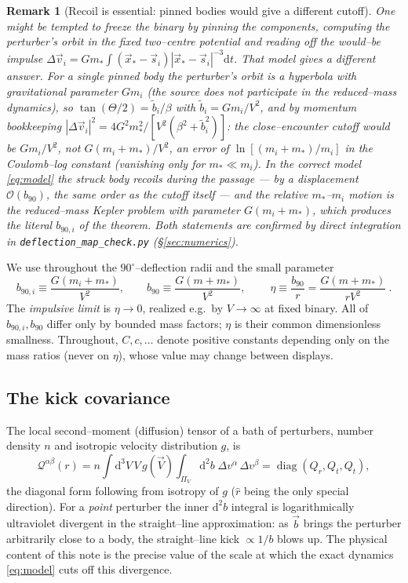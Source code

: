 \documentclass[11pt]{article}
\DeclareMathOperator{\diag}{diag}
\newcommand{\dd}{\mathrm{d}}
\newcommand{\bv}{\vec b}
\newcommand{\Q}{\mathcal Q}
\newcommand{\bnt}{b_{90}}
\newcommand{\order}[1]{\mathcal O\!\left(#1\right)}
\newtheorem{remark}{Remark}
\begin{document}
\begin{remark}[Recoil is essential: pinned bodies would give a different cutoff]
\label{rem:pinned}
One might be tempted to freeze the binary by \emph{pinning} the components, computing the
perturber's orbit in the fixed two--centre potential and reading off the would--be impulse
$\Delta\vec v_i=Gm_*\!\int(\vec x_*-\vec s_i)|\vec x_*-\vec s_i|^{-3}\dd t$. That model gives a
\emph{different} answer. For a single pinned body the perturber's orbit is a hyperbola with
gravitational parameter $Gm_i$ (the source does not participate in the reduced--mass dynamics), so
$\tan(\Theta/2)=\tilde b_i/\beta$ with $\tilde b_i=Gm_i/V^2$, and by momentum bookkeeping
$|\Delta\vec v_i|^2=4G^2m_*^2/[V^2(\beta^2+\tilde b_i^2)]$: the close--encounter cutoff would be
$Gm_i/V^2$, not $G(m_i+m_*)/V^2$, an error of $\ln[(m_i+m_*)/m_i]$ in the Coulomb--log constant
(vanishing only for $m_*\ll m_i$). In the correct model \eqref{eq:model} the struck body recoils
during the passage --- by a displacement $\order{\bnt}$, the same order as the cutoff itself --- and
the relative $m_*$--$m_i$ motion is the reduced--mass Kepler problem with parameter $G(m_i+m_*)$,
which produces the literal $b_{90,i}$ of the theorem. Both statements are confirmed by direct
integration in \texttt{deflection\_map\_check.py} (\S\ref{sec:numerics}).
\end{remark}

We use throughout the $90^\circ$--deflection radii and the small parameter
\begin{equation}
  b_{90,i}\equiv\frac{G(m_i+m_*)}{V^2},\qquad
  \bnt\equiv\frac{G(m+m_*)}{V^2},\qquad
  \boxed{\ \eta\equiv\frac{\bnt}{r}=\frac{G(m+m_*)}{rV^2}\ } .
  \label{eq:eta}
\end{equation}
The \emph{impulsive limit} is $\eta\to0$, realized e.g.\ by $V\to\infty$ at fixed binary. All of
$b_{90,i},\bnt$ differ only by bounded mass factors; $\eta$ is their common dimensionless smallness.
Throughout, $C,c,\dots$ denote positive constants depending only on the mass ratios (never on
$\eta$), whose value may change between displays.

\subsection{The kick covariance}
The local second--moment (diffusion) tensor of a bath of perturbers, number density $n$ and
isotropic velocity distribution $g$, is
\begin{equation}
  \Q^{\alpha\beta}(r)=n\int \dd^3V\,V\,g(\vec V)\int_{\Pi_V}\!\dd^2b\;\Delta v^\alpha\,\Delta v^\beta
  =\diag(Q_r,Q_t,Q_t),
  \label{eq:Qdef}
\end{equation}
the diagonal form following from isotropy of $g$ ($\hat r$ being the only special direction). For a
\emph{point} perturber the inner $\dd^2b$ integral is logarithmically ultraviolet divergent in the
straight--line approximation: as $\bv$ brings the perturber arbitrarily close to a body, the
straight--line kick $\propto1/b$ blows up. The physical content of this note is the precise value of
the scale at which the exact dynamics \eqref{eq:model} cuts off this divergence.
\end{document}
